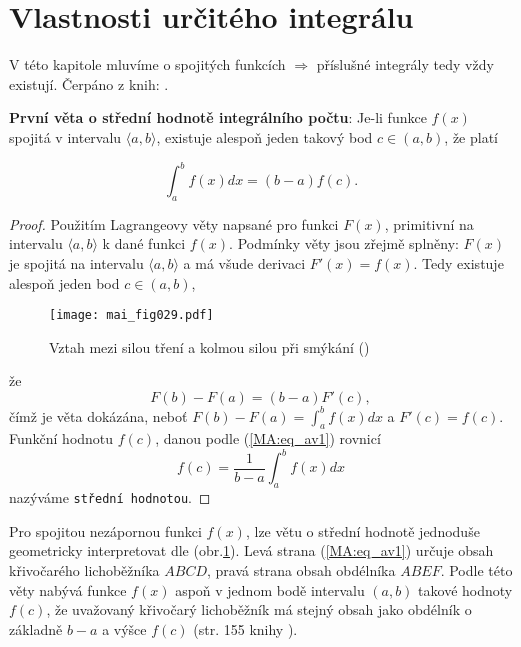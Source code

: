 \section{Vlastnosti určitého integrálu}
  V této kapitole mluvíme o spojitých funkcích $\Rightarrow$ příslušné integrály tedy vždy
  existují. Čerpáno z knih:
  \cite{Knichal}.

  \begin{lemma}
    \textbf{První věta o střední hodnotě integrálního počtu}: Je-li funkce $f(x)$ spojitá v
    intervalu $\langle a, b\rangle$, existuje alespoň jeden takový bod $c\in(a, b)$, že platí

    \begin{equation}\label{MA:eq_av1}
      \int_a^b f(x)dx = (b-a)f(c).
    \end{equation}
  \end{lemma}

  \begin{proof} Použitím Lagrangeovy věty napsané pro funkci $F(x)$, primitivní na intervalu
    $\langle a, b\rangle$ k dané funkci $f(x)$. Podmínky věty jsou zřejmě splněny: $F(x)$ je
    spojitá na intervalu $\langle a, b\rangle$ a má všude derivaci $F'(x)= f(x)$. Tedy existuje
    alespoň jeden bod $c\in(a, b)$,
    
    \begin{figure}[ht!]  %
      \centering
      \texttt{[image: mai\_fig029.pdf]}
      \caption{Vztah mezi silou tření a kolmou silou při smýkání
              (\cite[s.~173]{Feynman01})}
      \label{mai:fig029}
    \end{figure}

     že $$F(b)-F(a) = (b-a)F'(c),$$ čímž je věta dokázána, neboť $F(b)-F(a) = \int_a^bf(x)dx$ a
     $F'(c) = f(c)$. Funkční hodnotu $f(c)$, danou podle (\ref{MA:eq_av1}) rovnicí  
     \begin{equation}\label{MA:eq_av2}
        f(c) = \frac{1}{b-a}\int_a^b f(x)dx
     \end{equation}
     nazýváme \texttt{střední hodnotou}.
  \end{proof}

  Pro spojitou nezápornou funkci $f(x)$, lze větu o střední hodnotě jednoduše geometricky
  interpretovat dle (obr.\ref{mai:fig029}). Levá strana (\ref{MA:eq_av1}) určuje obsah
  křivočarého lichoběžníka $ABCD$, pravá strana obsah obdélníka $ABEF$. Podle této věty nabývá
  funkce $f(x)$ aspoň v jednom bodě intervalu $(a, b)$ takové hodnoty $f(c)$, že uvažovaný
  křivočarý lichoběžník má stejný obsah jako obdélník o základně $b-a$ a výšce $f(c)$ (str. 155
  knihy \cite{Knichal}).

